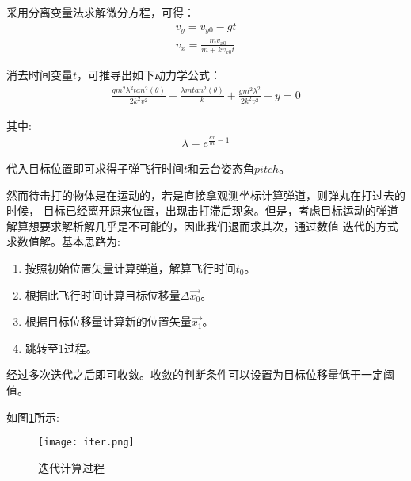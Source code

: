 采用分离变量法求解微分方程，可得：
\begin{gather}
    v_y = v_{y0}-gt \\
    v_x = \frac{m v_{x0}}{m+kv_{x0}t}
\end{gather}

消去时间变量$t$，可推导出如下动力学公式：
\begin{gather}
\frac{gm^2\lambda^2 tan^2(\theta)}{2k^2v^2}-\frac{\lambda m tan^2(\theta)}{k}+\frac{gm^2\lambda^2}{2k^2v^2}+y = 0
\end{gather}

其中:
\begin{gather}
    \lambda = e^{\frac{kx}{m}-1}
\end{gather}

代入目标位置即可求得子弹飞行时间$t$和云台姿态角$pitch$。\par
然而待击打的物体是在运动的，若是直接拿观测坐标计算弹道，则弹丸在打过去的时候，
目标已经离开原来位置，出现击打滞后现象。但是，考虑目标运动的弹道解算想要求解析解几乎是不可能的，因此我们退而求其次，通过数值
迭代的方式求数值解。基本思路为:
\begin{enumerate}
    \item 按照初始位置矢量计算弹道，解算飞行时间$t_0$。
    \item 根据此飞行时间计算目标位移量$\Delta \vec{x_0}$。
    \item 根据目标位移量计算新的位置矢量$\vec{x_1}$。
    \item 跳转至1过程。
\end{enumerate}

经过多次迭代之后即可收敛。收敛的判断条件可以设置为目标位移量低于一定阈值。

如图\ref{迭代计算过程}所示:

\begin{figure}[H]
    \centering
    \texttt{[image: iter.png]} 
    \caption{迭代计算过程} 
    \label{迭代计算过程}
\end{figure}